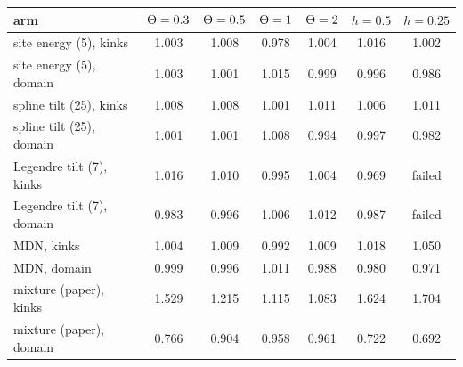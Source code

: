 \begin{tabular}{@{}l c c c c c c@{}}
\toprule
arm & $\Theta=0.3$ & $\Theta=0.5$ & $\Theta=1$ & $\Theta=2$ & $h=0.5$ & $h=0.25$ \\
\midrule
site energy (5), kinks & 1.003 & 1.008 & 0.978 & 1.004 & 1.016 & 1.002 \\
site energy (5), domain & 1.003 & 1.001 & 1.015 & 0.999 & 0.996 & 0.986 \\
spline tilt (25), kinks & 1.008 & 1.008 & 1.001 & 1.011 & 1.006 & 1.011 \\
spline tilt (25), domain & 1.001 & 1.001 & 1.008 & 0.994 & 0.997 & 0.982 \\
Legendre tilt (7), kinks & 1.016 & 1.010 & 0.995 & 1.004 & 0.969 & failed \\
Legendre tilt (7), domain & 0.983 & 0.996 & 1.006 & 1.012 & 0.987 & failed \\
MDN, kinks & 1.004 & 1.009 & 0.992 & 1.009 & 1.018 & 1.050 \\
MDN, domain & 0.999 & 0.996 & 1.011 & 0.988 & 0.980 & 0.971 \\
mixture (paper), kinks & 1.529 & 1.215 & 1.115 & 1.083 & 1.624 & 1.704 \\
mixture (paper), domain & 0.766 & 0.904 & 0.958 & 0.961 & 0.722 & 0.692 \\
\bottomrule
\end{tabular}
